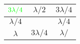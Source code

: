 \begin{minipage}{0.55\textwidth}
    \begin{center}
	\begin{tabular}{ |c|c|c| } 
		\hline
		$\color{green}3\lambda/4$ & $\lambda/2$ & $3\lambda/4$ \\
		\hline
		$\lambda/4$ &  & $\lambda/4$ \\
 		\hline
 		$\lambda$ & $3\lambda/4$ & $\lambda/$ \\
 		\hline
	\end{tabular}
	\end{center}
\end{minipage}
\hfill
\begin{minipage}{0.35\textwidth}
    
\end{minipage}
